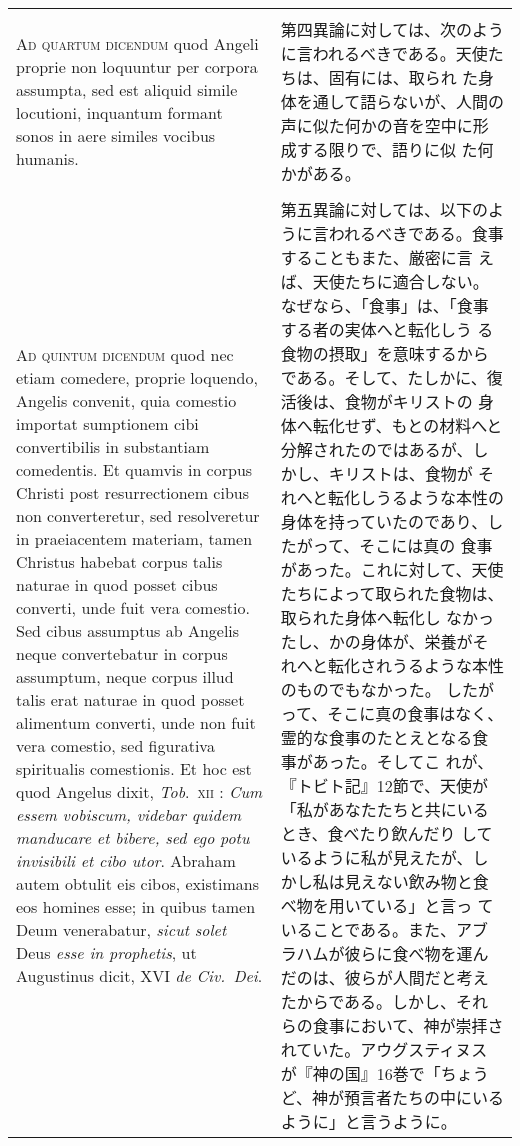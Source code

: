 \documentclass[10pt]{jsarticle} %
\begin{document}
\begin{longtable}{p{21em}p{21em}}
\\\\



{\scshape Ad quartum dicendum} quod Angeli proprie non loquuntur per corpora
assumpta, sed est aliquid simile locutioni, inquantum formant sonos in aere
similes vocibus humanis.

&

 第四異論に対しては、次のように言われるべきである。天使たちは、固有には、取られ
た身体を通して語らないが、人間の声に似た何かの音を空中に形成する限りで、語りに似
た何かがある。

\\\\


{\scshape Ad quintum dicendum} quod nec etiam comedere, proprie loquendo,
Angelis convenit, quia comestio importat sumptionem cibi convertibilis in
substantiam comedentis. Et quamvis in corpus Christi post resurrectionem cibus
non converteretur, sed resolveretur in praeiacentem materiam, tamen Christus
habebat corpus talis naturae in quod posset cibus converti, unde fuit vera
comestio. Sed cibus assumptus ab Angelis neque convertebatur in corpus
assumptum, neque corpus illud talis erat naturae in quod posset alimentum
converti, unde non fuit vera comestio, sed figurativa spiritualis
comestionis. Et hoc est quod Angelus dixit, {\itshape Tob}.~{\scshape xii} :
{\itshape Cum essem vobiscum, videbar quidem manducare et bibere, sed ego potu
invisibili et cibo utor}. Abraham autem obtulit eis cibos, existimans eos
homines esse; in quibus tamen Deum venerabatur, {\itshape sicut solet} Deus
{\itshape esse in prophetis}, ut Augustinus dicit, XVI {\itshape de Civ.~Dei}.


&

第五異論に対しては、以下のように言われるべきである。食事することもまた、厳密に言
えば、天使たちに適合しない。なぜなら、「食事」は、「食事する者の実体へと転化しう
る食物の摂取」を意味するからである。そして、たしかに、復活後は、食物がキリストの
身体へ転化せず、もとの材料へと分解されたのではあるが、しかし、キリストは、食物が
それへと転化しうるような本性の身体を持っていたのであり、したがって、そこには真の
食事があった。これに対して、天使たちによって取られた食物は、取られた身体へ転化し
なかったし、かの身体が、栄養がそれへと転化されうるような本性のものでもなかった。
したがって、そこに真の食事はなく、霊的な食事のたとえとなる食事があった。そしてこ
れが、『トビト記』12節で、天使が「私があなたたちと共にいるとき、食べたり飲んだり
しているように私が見えたが、しかし私は見えない飲み物と食べ物を用いている」と言っ
ていることである。また、アブラハムが彼らに食べ物を運んだのは、彼らが人間だと考え
たからである。しかし、それらの食事において、神が崇拝されていた。アウグスティヌス
が『神の国』16巻で「ちょうど、神が預言者たちの中にいるように」と言うように。


\end{longtable}
\end{document}
